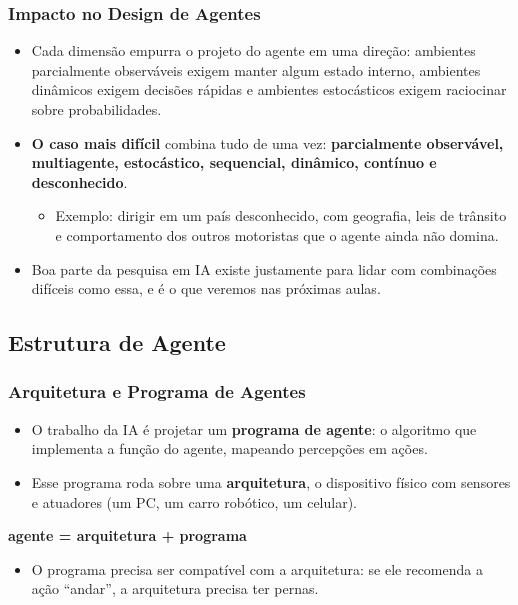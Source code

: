 \documentclass{beamer}
\begin{document}
\begin{frame}
\frametitle{Impacto no Design de Agentes}
\begin{itemize}
    \item Cada dimensão empurra o projeto do agente em uma direção: ambientes parcialmente observáveis exigem manter algum estado interno, ambientes dinâmicos exigem decisões rápidas e ambientes estocásticos exigem raciocinar sobre probabilidades.
    \item \textbf{O caso mais difícil} combina tudo de uma vez: \textbf{parcialmente observável, multiagente, estocástico, sequencial, dinâmico, contínuo e desconhecido}.
    \begin{itemize}
     \item Exemplo: dirigir em um país desconhecido, com geografia, leis de trânsito e comportamento dos outros motoristas que o agente ainda não domina.
    \end{itemize}
    \item Boa parte da pesquisa em IA existe justamente para lidar com combinações difíceis como essa, e é o que veremos nas próximas aulas.
\end{itemize}
\end{frame}

\subsection{Estrutura de Agente}

\begin{frame}
\frametitle{Arquitetura e Programa de Agentes}
\footnotesize
\begin{itemize}
    \item O trabalho da IA é projetar um \textbf{programa de agente}: o algoritmo que implementa a função do agente, mapeando percepções em ações.
    \item Esse programa roda sobre uma \textbf{arquitetura}, o dispositivo físico com sensores e atuadores (um PC, um carro robótico, um celular).
\end{itemize}
\begin{center}
\textbf{agente = arquitetura + programa}
\end{center}
\begin{itemize}
    \item O programa precisa ser compatível com a arquitetura: se ele recomenda a ação ``andar'', a arquitetura precisa ter pernas.
\end{itemize}
\end{frame}
\end{document}
